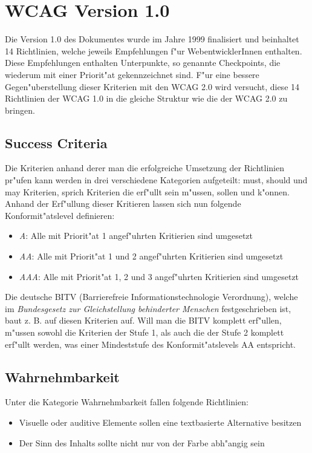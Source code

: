 \documentclass[a4paper,bibtotoc,oneside]{scrbook}
\begin{document}
\section{WCAG Version 1.0}
Die Version 1.0 des Dokumentes wurde im Jahre 1999 finalisiert und beinhaltet 14 Richtlinien, welche jeweils Empfehlungen f"ur WebentwicklerInnen enthalten. Diese Empfehlungen enthalten Unterpunkte, so genannte Checkpoints, die wiederum mit einer Priorit"at gekennzeichnet sind. \cite[Abschnitt Abstract]{wcag1}
F"ur eine bessere Gegen"uberstellung dieser Kriterien mit den WCAG 2.0 wird versucht, diese 14 Richtlinien der WCAG 1.0 in die gleiche Struktur wie die der WCAG 2.0 zu bringen.

\subsection{Success Criteria}
Die Kriterien anhand derer man die erfolgreiche Umsetzung der Richtlinien pr"ufen kann werden in drei verschiedene Kategorien aufgeteilt: must, should und may Kriterien, sprich Kriterien die erf"ullt sein m"ussen, sollen und k"onnen. Anhand der Erf"ullung dieser Kritieren lassen sich nun folgende Konformit"atslevel definieren: \cite[Abschnitt 4]{wcag1}

\begin{itemize}
\item \emph{A}: Alle mit Priorit"at 1 angef"uhrten Kritierien sind umgesetzt
\item \emph{AA}: Alle mit Priorit"at 1 und 2 angef"uhrten Kritierien sind umgesetzt
\item \emph{AAA}: Alle mit Priorit"at 1, 2 und 3 angef"uhrten Kritierien sind umgesetzt
\end{itemize}

Die deutsche BITV (Barrierefreie Informationstechnologie Verordnung), welche im \emph{Bundesgesetz zur Gleichstellung behinderter Menschen} festgeschrieben ist, baut z. B. auf diesen Kriterien auf. Will man die BITV komplett erf"ullen, m"ussen sowohl die Kriterien der Stufe 1, als auch die der Stufe 2 komplett erf"ullt werden, was einer Mindeststufe des Konformit"atslevels AA entspricht. \cite[S. 38-39]{barr_webd}

\subsection{Wahrnehmbarkeit}
Unter die Kategorie Wahrnehmbarkeit fallen folgende Richtlinien: 

\begin{itemize}
\item Visuelle oder auditive Elemente sollen eine textbasierte Alternative besitzen\cite[Abschnitt 6.1]{wcag1}
\item Der Sinn des Inhalts sollte nicht nur von der Farbe abh"angig sein \cite[Abschnitt 6.2]{wcag1}
\end{itemize}
\end{document}
